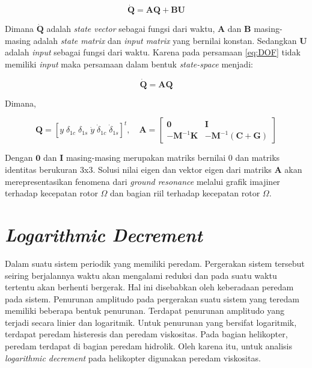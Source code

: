 \begin{equation}
	\label{eq:AdanQ}
	\mathbf{\dot{Q}}=\mathbf{AQ}+\mathbf{BU}
\end{equation}

Dimana $\mathbf{\dot{Q}}$ adalah \textit{state vector} sebagai fungsi dari waktu, $\mathbf{A}$ dan $\mathbf{B}$ masing-masing adalah \textit{state matrix} dan \textit{input matrix} yang bernilai konstan. Sedangkan $\mathbf{U}$ adalah \textit{input} sebagai fungsi dari waktu. Karena pada persamaan \ref{eq:DOF} tidak memiliki \textit{input} maka persamaan dalam bentuk \textit{state-space} menjadi:

\begin{equation}
	\label{eq:state-space_simplified}
	\mathbf{\dot{Q}}=\mathbf{AQ}
\end{equation}

Dimana,

\begin{equation}
	\label{eq:state-space}
	\mathbf{Q}=[y \; \delta_{1c} \; \delta_{1s} \; \dot{y} \; \dot{\delta}_{1c} \; \dot{\delta}_{1s}]^t, \quad
	\mathbf{A}=\begin{bmatrix}
		\mathbf{0}& \mathbf{I}\\
		\mathbf{-M}^{-1}\mathbf{K}& \mathbf{-M}^{-1}(\mathbf{C}+\mathbf{G})
	\end{bmatrix}	
\end{equation}

Dengan $\mathbf{0}$ dan $\mathbf{I}$ masing-masing merupakan matriks bernilai $0$ dan matriks identitas berukuran 3x3. Solusi nilai eigen dan vektor eigen dari matriks $\mathbf{A}$ akan merepresentasikan fenomena dari \textit{ground resonance} melalui grafik imajiner terhadap kecepatan rotor $\Omega$ dan bagian riil terhadap kecepatan rotor $\Omega$.

\section{\textit{Logarithmic Decrement}}

Dalam suatu sistem periodik yang memiliki peredam. Pergerakan sistem tersebut seiring berjalannya waktu akan mengalami reduksi dan pada suatu waktu tertentu akan berhenti bergerak. Hal ini disebabkan oleh keberadaan peredam pada sistem. Penurunan amplitudo pada pergerakan suatu sistem yang teredam memiliki beberapa bentuk penurunan. Terdapat penurunan amplitudo yang terjadi secara linier dan logaritmik. Untuk penurunan yang bersifat logaritmik, terdapat peredam histeresis dan peredam viskositas. Pada bagian helikopter, peredam terdapat di bagian peredam hidrolik. Oleh karena itu, untuk analisis \textit{logarithmic decrement} pada helikopter digunakan peredam viskositas.

